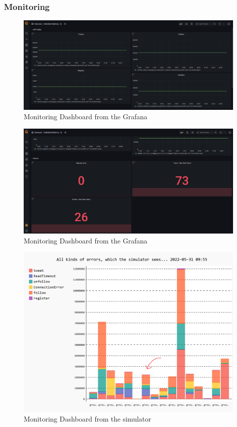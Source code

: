 \subsubsection{Monitoring}
\label{app:monitoring}
\begin {figure}[H]
    \centering
    \includegraphics[scale=0.30]{images/monitoring/monitoring1.PNG}
    \caption{Monitoring Dashboard from the Grafana}
    \label{fig:simMonitor}
\end{figure}
\begin {figure}[H]
    \centering
    \includegraphics[scale=0.30]{images/monitoring/monitoring2.PNG}
    \caption{Monitoring Dashboard from the Grafana}
    \label{fig:simMonitor}
\end{figure}

\begin {figure}[H]
    \centering
    \includegraphics[scale=0.42]{images/monitoring/SimulatorMonitor.PNG}
    \caption{Monitoring Dashboard from the simulator}
    \label{fig:simMonitor}
\end{figure}

